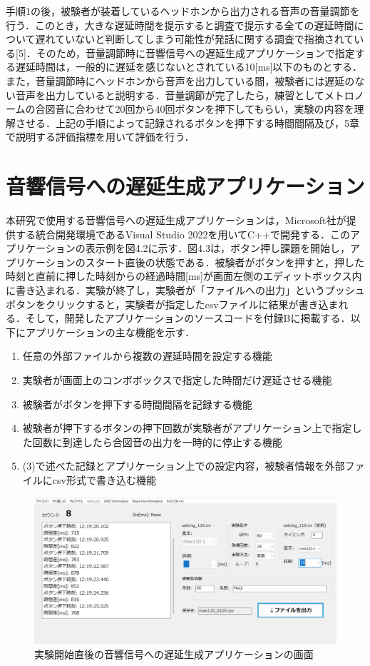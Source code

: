 手順1の後，被験者が装着しているヘッドホンから出力される音声の音量調節を行う．このとき，大きな遅延時間を提示すると調査で提示する全ての遅延時間について遅れていないと判断してしまう可能性が発話に関する調査で指摘されている[5]．そのため，音量調節時に音響信号への遅延生成アプリケーションで指定する遅延時間は，一般的に遅延を感じないとされている10[ms]以下のものとする．また，音量調節時にヘッドホンから音声を出力している間，被験者には遅延のない音声を出力していると説明する．音量調節が完了したら，練習としてメトロノームの合図音に合わせて20回から40回ボタンを押下してもらい，実験の内容を理解させる．上記の手順によって記録されるボタンを押下する時間間隔及び，5章で説明する評価指標を用いて評価を行う．
\section{音響信号への遅延生成アプリケーション}
本研究で使用する音響信号への遅延生成アプリケーションは，Microsoft社が提供する統合開発環境であるVisual Studio 2022を用いてC++で開発する．このアプリケーションの表示例を図4.2に示す．図4.3は，ボタン押し課題を開始し，アプリケーションのスタート直後の状態である．被験者がボタンを押すと，押した時刻と直前に押した時刻からの経過時間[ms]が画面左側のエディットボックス内に書き込まれる．実験が終了し，実験者が「ファイルへの出力」というプッシュボタンをクリックすると，実験者が指定したcsvファイルに結果が書き込まれる．そして，開発したアプリケーションのソースコードを付録Bに掲載する．以下にアプリケーションの主な機能を示す．
\begin{enumerate}[leftmargin=*]
\item 任意の外部ファイルから複数の遅延時間を設定する機能
\item 実験者が画面上のコンボボックスで指定した時間だけ遅延させる機能
\item 被験者がボタンを押下する時間間隔を記録する機能
\item 被験者が押下するボタンの押下回数が実験者がアプリケーション上で指定した回数に到達したら合図音の出力を一時的に停止する機能
\item (3)で述べた記録とアプリケーション上での設定内容，被験者情報を外部ファイルにcsv形式で書き込む機能
\end{enumerate}
\begin{figure}[tb]
  \centering
  \includegraphics[scale=0.34]{figures/Apprication/App_kyakkann.png}
  \caption{実験開始直後の音響信号への遅延生成アプリケーションの画面}
\end{figure}
